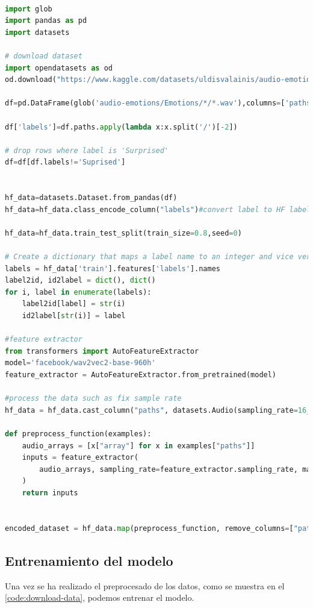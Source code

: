 \begin{lstlisting}[language=Python, caption=Preprocesado del dataset, label={code:download-data}]

import glob
import pandas as pd
import datasets

# download dataset
import opendatasets as od
od.download("https://www.kaggle.com/datasets/uldisvalainis/audio-emotions")

df=pd.DataFrame(glob('audio-emotions/Emotions/*/*.wav'),columns=['paths'])

df['labels']=df.paths.apply(lambda x:x.split('/')[-2])

# drop rows where label is 'Surprised'
df=df[df.labels!='Suprised']


hf_data=datasets.Dataset.from_pandas(df)
hf_data=hf_data.class_encode_column("labels")#convert label to HF label class

hf_data=hf_data.train_test_split(train_size=0.8,seed=0)

# Create a dictionary that maps a label name to an integer and vice versa. The mapping will help the model recover the label name from the label number:
labels = hf_data['train'].features['labels'].names
label2id, id2label = dict(), dict()
for i, label in enumerate(labels):
    label2id[label] = str(i)
    id2label[str(i)] = label

#feature extractor
from transformers import AutoFeatureExtractor
model='facebook/wav2vec2-base-960h'
feature_extractor = AutoFeatureExtractor.from_pretrained(model)

#process the data such as fix sample rate
hf_data = hf_data.cast_column("paths", datasets.Audio(sampling_rate=16_000))

def preprocess_function(examples):
    audio_arrays = [x["array"] for x in examples["paths"]]
    inputs = feature_extractor(
        audio_arrays, sampling_rate=feature_extractor.sampling_rate, max_length=16000*2, truncation=True
    )
    return inputs


encoded_dataset = hf_data.map(preprocess_function, remove_columns=["paths"], batched=True)


\end{lstlisting}



\subsection{Entrenamiento del modelo}\label{seccion:entrenamiento-del-modelo}
Una vez se ha realizado el preprocesado de los datos, como se muestra en el \autoref{code:download-data}, podemos entrenar el modelo.

